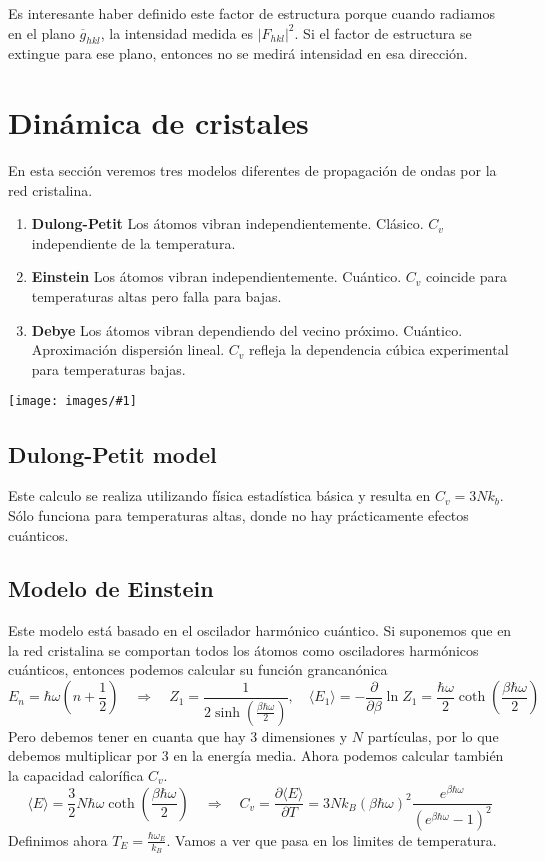 \documentclass[leqno]{article}
\newcommand{\incimg}[1]{%
\center
\texttt{[image: images/\#1]}
}
\begin{document}
Es interesante haber definido este factor de estructura porque cuando radiamos en el plano $\overline{g}_{hkl}$, la intensidad medida es $|F_{hkl}|^2$. Si el factor de estructura se extingue para ese plano, entonces no se medirá intensidad en esa dirección.



\section{Dinámica de cristales}
En esta sección veremos tres modelos diferentes de propagación de ondas por la red cristalina.

\begin{minipage}{0.6\textwidth}
\begin{enumerate}[topsep=-6pt, itemsep=0pt]
  \item \textbf{Dulong-Petit} Los átomos vibran independientemente. Clásico. $C_v$ independiente de la temperatura.
  \item \textbf{Einstein} Los átomos vibran independientemente. Cuántico. $C_v$ coincide para temperaturas altas pero falla para bajas.
  \item \textbf{Debye} Los átomos vibran dependiendo del vecino próximo. Cuántico. Aproximación dispersión lineal. $C_v$ refleja la dependencia cúbica experimental para temperaturas bajas.
\end{enumerate}
\end{minipage}
\begin{minipage}{0.4\textwidth}
\incimg{comparisoncv.jpg}
\end{minipage}

\subsection{Dulong-Petit model}
Este calculo se realiza utilizando física estadística básica y resulta en $C_v = 3Nk_b$. Sólo funciona para temperaturas altas, donde no hay prácticamente efectos cuánticos.

\subsection{Modelo de Einstein}
Este modelo está basado en el oscilador harmónico cuántico. Si suponemos que en la red cristalina se comportan todos los átomos como osciladores harmónicos cuánticos, entonces podemos calcular su función grancanónica
\[
  E_n = \hbar \omega (n+\frac{1}{2}) \quad \Rightarrow \quad Z_1 = \frac{1}{2 \sinh(\frac{\beta \hbar \omega }{2})}, \quad \langle E_1 \rangle = - \frac{\partial }{\partial \beta } \ln Z_1 = \frac{\hbar\omega }{2} \coth \left( \frac{\beta \hbar \omega }{2} \right) 
\] 
Pero debemos tener en cuanta que hay 3 dimensiones y $N$ partículas, por lo que debemos multiplicar por 3 en la energía media. Ahora podemos calcular también la capacidad calorífica $C_v$.
 \[
\langle E\rangle = \frac{3}{2} N \hbar \omega \coth \left( \frac{\beta \hbar \omega  }{2} \right) \quad \Rightarrow \quad
C_v = \frac{\partial \langle E\rangle}{\partial T}  = 3Nk_B (\beta \hbar \omega )^2 \frac{e^{\beta \hbar \omega }}{(e^{\beta \hbar \omega }-1)^2}
\] 
Definimos ahora $T_E = \frac{\hbar \omega_E}{k_B}$. Vamos a ver que pasa en los limites de temperatura.
\end{document}
